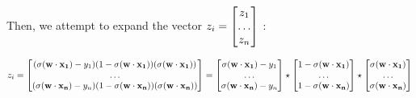 \documentclass[12pt]{article}
\begin{document}
Then, we attempt to expand the vector $z_i = \left[\begin{array}{@{}c@{}}
                                             z_1 \\
                                             \dots \\
                                             z_n
                                             \end{array} \right]$ :
\begin{center}
    $z_i = \left[\begin{array}{@{}c@{}}
            (\sigma(\mathbf{w \cdot x_1})-y_1)(1-\sigma(\mathbf{w \cdot x_1}))(\sigma(\mathbf{w\cdot x_1})) \\
            \dots \\
            (\sigma(\mathbf{w \cdot x_n})-y_n)(1-\sigma(\mathbf{w \cdot x_n}))(\sigma(\mathbf{w\cdot x_n})) 
            \end{array} \right]= \left[\begin{array}{@{}c@{}}
                                 \sigma(\mathbf{w \cdot x_1})-y_1 \\ 
                                 \dots \\
                                 \sigma(\mathbf{w \cdot x_n})-y_n
                                 \end{array} \right] \star \left[\begin{array}{@{}c@{}}
                                                           1-\sigma(\mathbf{w \cdot x_1}) \\
                                                           \dots \\
                                                           1-\sigma(\mathbf{w \cdot x_n})
                                                           \end{array} \right] \star \left[\begin{array}{@{}c@{}}
                                                                                     \sigma(\mathbf{w\cdot x_1}) \\
                                                                                     \dots \\
                                                                                     \sigma(\mathbf{w\cdot x_n})
                                                                                     \end{array} \right]$
\end{center}
\end{document}
